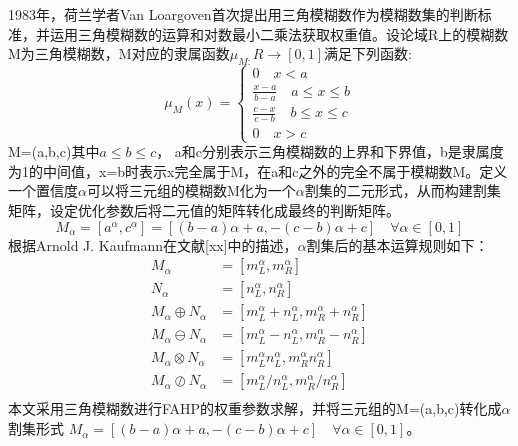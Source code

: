 1983年，荷兰学者Van Loargoven首次提出用三角模糊数作为模糊数集的判断标准，并运用三角模糊数的运算和对数最小二乘法获取权重值。设论域R上的模糊数M为三角模糊数，M对应的隶属函数\begin{math}\mu_{M:}R\to[0,1]\end{math}满足下列函数:
\begin{equation}
\mu_{M}(x) = \left\{\begin{array}{l}
0 \quad x<a \\ [0.3cm]
\frac{x-a}{b-a} \quad a\le x\le b \\ [0.2cm]
\frac{c-x}{c-b} \quad b\le x\le c \\ [0.2cm]
0 \quad x>c
\end{array}\right.
\end{equation}
M=(a,b,c)其中\begin{math}a\le b\le c\end{math}，
a和c分别表示三角模糊数的上界和下界值，b是隶属度为1的中间值，x=b时表示x完全属于M，在a和c之外的完全不属于模糊数M。定义一个置信度\begin{math}\alpha\end{math}可以将三元组的模糊数M化为一个\begin{math}\alpha\end{math}割集的二元形式，从而构建割集矩阵，设定优化参数后将二元值的矩阵转化成最终的判断矩阵。
\begin{equation}
	M_{\alpha} = [a^{\alpha},c^{\alpha}]=[(b-a)\alpha+a,-(c-b)\alpha+c] \quad \forall \alpha\in[0,1]
\end{equation}
根据Arnold J. Kaufmann在文献[xx]中的描述，\begin{math}\alpha\end{math}割集后的基本运算规则如下：
\begin{equation}
\begin{split}
	M_{\alpha} &= [m_{L}^{\alpha},m_{R}^{\alpha}] \\[0.2cm]
	N_{\alpha} &= [n_{L}^{\alpha},n_{R}^{\alpha}] \\[0.2cm]
	M_{\alpha}\oplus N_{\alpha} &= [m_{L}^{\alpha}+n_{L}^{\alpha},m_{R}^{\alpha}+n_{R}^{\alpha}] \\[0.2cm]
	M_{\alpha}\ominus N_{\alpha} &= [m_{L}^{\alpha}-n_{L}^{\alpha},m_{R}^{\alpha}-n_{R}^{\alpha}] \\[0.2cm]
	M_{\alpha}\otimes N_{\alpha} &= [m_{L}^{\alpha}n_{L}^{\alpha},m_{R}^{\alpha}n_{R}^{\alpha}] \\[0.2cm]
	M_{\alpha}\oslash N_{\alpha} &= [m_{L}^{\alpha}/n_{L}^{\alpha},m_{R}^{\alpha}/n_{R}^{\alpha}] \\[0.2cm]
	\end{split}
\end{equation}
本文采用三角模糊数进行FAHP的权重参数求解，并将三元组的M=(a,b,c)转化成\begin{math}\alpha\end{math}割集形式
\begin{math}M_{\alpha} =[(b-a)\alpha+a,-(c-b)\alpha+c] \quad \forall \alpha\in[0,1]\end{math}。

